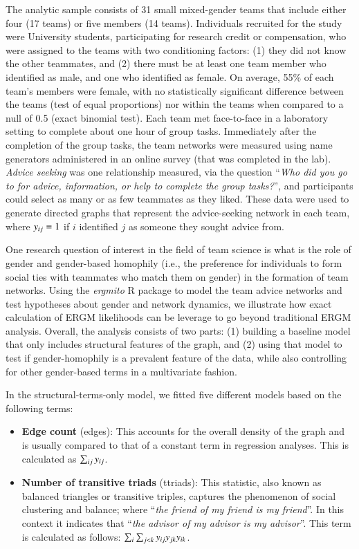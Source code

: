 \documentclass[review, nonatbib,doubleblind]{elsarticle/elsarticle}
\begin{document}
The analytic sample consists of 31 small mixed-gender teams that include either four (17 teams) or five members (14 teams). Individuals recruited for the study were University students, participating for research credit or compensation, who were assigned to the teams with two conditioning factors: (1) they did not know the other teammates, and (2) there must be at least one team member who identified as male, and one who identified as female. On average, 55\% of each team's members were female, with no statistically significant difference between the teams (test of equal proportions) nor within the teams when compared to a null of 0.5 (exact binomial test). Each team met face-to-face in a laboratory setting to complete about one hour of group tasks. Immediately after the completion of the group tasks, the team networks were measured using name generators administered in an online survey (that was completed in the lab). \textit{Advice seeking} was one relationship measured, via the question ``\textit{Who did you go to for advice, information, or help to complete the group tasks?}'', and participants could select as many or as few teammates as they liked. These data were used to generate directed graphs that represent the advice-seeking network in each team, where $y_{ij} = 1$ if $i$ identified $j$ as someone they sought advice from. %

One research question of interest in the field of team science is what is the role of gender and gender-based homophily (i.e., the preference for individuals to form social ties with teammates who match them on gender) in the formation of team networks. Using the \textit{ergmito} R package to model the team advice networks and test hypotheses about gender and network dynamics, we illustrate how exact calculation of ERGM likelihoods can be leverage to go beyond traditional ERGM analysis. Overall, the analysis consists of two parts: (1) building a baseline model that only includes structural features of the graph, and (2) using that model to test if gender-homophily is a prevalent feature of the data, while also controlling for other gender-based terms in a multivariate fashion. 

In the structural-terms-only model, we fitted five different models based on the following terms:

\begin{itemize}
    \item \textbf{Edge count} (edges): This accounts for the overall density of the graph and is usually compared to that of a constant term in regression analyses. This is calculated as $\sum_{ij}y_{ij}$.
    \item \textbf{Number of transitive triads} (ttriads): This statistic, also known as balanced triangles or transitive triples, captures the phenomenon of social clustering and balance; where ``\textit{the friend of my friend is my friend}''. In this context it indicates that ``\textit{the advisor of my advisor is my advisor}''. This term is calculated as follows: $\sum_{i}\sum_{j<k}y_{ij}y_{jk}y_{ik}$.
\end{itemize}
\end{document}
